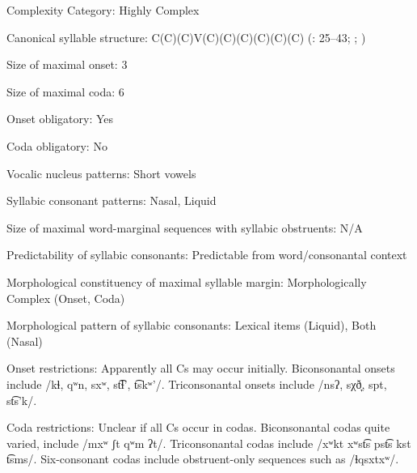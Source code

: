{\begin{appendixdesc}
\item[Complexity Category:] Highly Complex

\item[Canonical syllable structure:] C(C)(C)V(C)(C)(C)(C)(C)(C) (\citealt{ThompsonThompson1992}: 25--43; \citealt{ThompsonThompson1996}; \citealt{ThompsonEtAl1996})

\item[Size of maximal onset:] 3

\item[Size of maximal coda:] 6

\item[Onset obligatory:] Yes

\item[Coda obligatory:] No

\item[Vocalic nucleus patterns:] Short vowels

\item[Syllabic consonant patterns:] Nasal, Liquid

\item[Size of maximal word-marginal sequences with syllabic obstruents:] N/A

\item[Predictability of syllabic consonants:] Predictable from word/consonantal context

\item[Morphological constituency of maximal syllable margin:] Morphologically Complex (Onset, Coda)

\item[Morphological pattern of syllabic consonants:] Lexical items (Liquid), Both (Nasal)

\item[Onset restrictions:] Apparently all Cs may occur initially. Biconsonantal onsets include /kɬ, qʷn, sxʷ, st͡ɬ’, t͡skʷ’/. Triconsonantal onsets include /nsʔ, sχð̞, spt, st͡s’k/.

\item[Coda restrictions:] Unclear if all Cs occur in codas. Biconsonantal codas quite varied, include /mxʷ ʃt qʷm ʔt/. Triconsonantal codas include /xʷkt xʷst͡s pst͡s kst t͡sms/. Six-consonant codas include obstruent-only sequences such as /ɬqsxtxʷ/.


\end{appendixdesc}}

